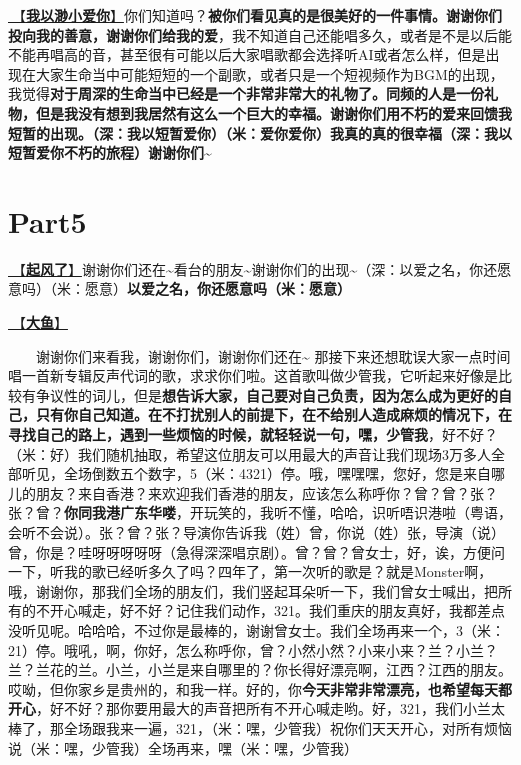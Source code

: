 \documentclass[]{ctexbook}
\begin{document}
\hyperref[loving-you-in-my-humble-way]{🎵【\textbf{我以渺小爱你}】}你们知道吗？\textbf{被你们看见真的是很美好的一件事情。谢谢你们投向我的善意，谢谢你们给我的爱}，我不知道自己还能唱多久，或者是不是以后能不能再唱高的音，甚至很有可能以后大家唱歌都会选择听AI或者怎么样，但是出现在大家生命当中可能短短的一个副歌，或者只是一个短视频作为BGM的出现，我觉得\textbf{对于周深的生命当中已经是一个非常非常大的礼物了。同频的人是一份礼物，但是我没有想到我居然有这么一个巨大的幸福。谢谢你们用不朽的爱来回馈我短暂的出现。（深：我以短暂爱你）（米：爱你爱你）我真的真的很幸福（深：我以短暂爱你不朽的旅程）谢谢你们\textasciitilde{}}

\section{Part5}\label{chongqing-20241007-part5}

\hyperref[the-wind-rises]{🎵【\textbf{起风了}】}谢谢你们还在\textasciitilde 看台的朋友\textasciitilde 谢谢你们的出现\textasciitilde（深：以爱之名，你还愿意吗）（米：愿意）\textbf{以爱之名，你还愿意吗（米：愿意）}

\hyperref[big-fish]{🎵【\textbf{大鱼}】}

  谢谢你们来看我，谢谢你们，谢谢你们还在\textasciitilde{}
那接下来还想耽误大家一点时间唱一首新专辑反声代词的歌，求求你们啦。这首歌叫做少管我，它听起来好像是比较有争议性的词儿，但是\textbf{想告诉大家，自己要对自己负责，因为怎么成为更好的自己，只有你自己知道。在不打扰别人的前提下，在不给别人造成麻烦的情况下，在寻找自己的路上，遇到一些烦恼的时候，就轻轻说一句，嘿，少管我}，好不好？（米：好）我们随机抽取，希望这位朋友可以用最大的声音让我们现场3万多人全部听见，全场倒数五个数字，5（米：4321）停。哦，嘿嘿嘿，您好，您是来自哪儿的朋友？来自香港？来欢迎我们香港的朋友，应该怎么称呼你？曾？曾？张？张？曾？\textbf{你同我港广东华喽}，开玩笑的，我听不懂，哈哈，识听唔识港啦（粤语，会听不会说）。张？曾？张？导演你告诉我（姓）曾，你说（姓）张，导演（说）曾，你是？哇呀呀呀呀呀（急得深深唱京剧）。曾？曾？曾女士，好，诶，方便问一下，听我的歌已经听多久了吗？四年了，第一次听的歌是？就是Monster啊，哦，谢谢你，那我们全场的朋友们，我们竖起耳朵听一下，我们曾女士喊出，把所有的不开心喊走，好不好？记住我们动作，321。我们重庆的朋友真好，我都差点没听见呢。哈哈哈，不过你是最棒的，谢谢曾女士。我们全场再来一个，3（米：21）停。哦吼，啊，你好，怎么称呼你，曾？小然小然？小来小来？兰？小兰？兰？兰花的兰。小兰，小兰是来自哪里的？你长得好漂亮啊，江西？江西的朋友。哎呦，但你家乡是贵州的，和我一样。好的，你\textbf{今天非常非常漂亮，也希望每天都开心}，好不好？那你要用最大的声音把所有不开心喊走哟。好，321，我们小兰太棒了，那全场跟我来一遍，321，（米：嘿，少管我）祝你们天天开心，对所有烦恼说（米：嘿，少管我）全场再来，嘿（米：嘿，少管我）
\end{document}
